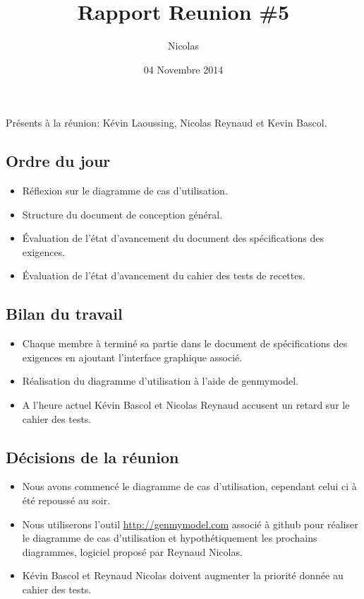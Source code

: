 \documentclass{article}
\title{Rapport Reunion \#5}
\author{Nicolas \bsc{Reynaud}}
\date{04 Novembre 2014}
\begin{document}
\maketitle
\newpage

Présents à la réunion: Kévin Laoussing, Nicolas Reynaud et Kevin Bascol.

\subsection*{Ordre du jour}
	\begin{itemize}
		\item Réflexion sur le diagramme de cas d'utilisation.
		\item Structure du document de conception général.
		\item Évaluation de l'état d'avancement du document des spécifications des exigences.
		\item Évaluation de l'état d'avancement du cahier des tests de recettes.
	\end{itemize}

\subsection*{Bilan du travail}
	\begin{itemize}
		\item Chaque membre à terminé sa partie dans le document de spécifications des exigences en ajoutant l'interface graphique associé.
		\item Réalisation du diagramme d'utilisation à l'aide de genmymodel.
		\item A l'heure actuel Kévin Bascol et Nicolas Reynaud accusent un retard sur le cahier des tests.
	\end{itemize}
	
\subsection*{Décisions de la réunion}
	\begin{itemize}
		\item Nous avons commencé le diagramme de cas d'utilisation, cependant celui ci à été repoussé au soir.
		\item Nous utiliserons l'outil \url{http://genmymodel.com} associé à github pour réaliser le diagramme de cas d'utilisation et hypothétiquement les prochains diagrammes, logiciel proposé par Reynaud Nicolas.
		\item Kévin Bascol et Reynaud Nicolas doivent augmenter la priorité donnée au cahier des tests.
	\end{itemize}
	
\end{document}
